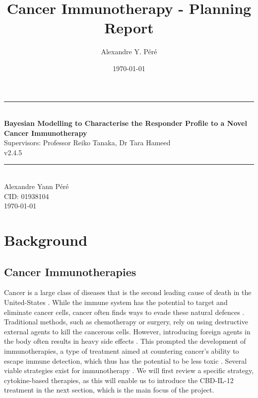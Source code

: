 \documentclass[11pt]{article}
\title{Cancer Immunotherapy - Planning Report}
\author{Alexandre Y. Péré }
\date{\today}
\begin{document}
\begin{titlepage}
    \newcommand{\HRule}{\rule{\linewidth}{0.5mm}}
    \begin{center}
        \HRule \\[0.4cm]
    { \LARGE \bfseries Bayesian Modelling to Characterise the Responder Profile to a  Novel Cancer Immunotherapy\\[0.55cm] }
    { \large Supervisors: Professor Reiko Tanaka, Dr Tara Hameed} \\
    v2.4.5
    \\[0.4cm]
    \HRule \\[0.5cm]
    { \large Alexandre Yann Péré \\[0.1cm]
    CID: 01938104  \\[0.1cm]
    \today \\ [0.1cm]
    \vspace{10pt}}
    \end{center}
\end{titlepage}

\tableofcontents

\pagebreak 
\section{Background}\label{sec:specs}

\subsection{Cancer Immunotherapies}\label{sec:cancer}
Cancer is a large class of diseases that is the second leading cause of death in the United-States \cite{nchs}. While the immune system has the potential to target and eliminate cancer cells, cancer often finds ways to evade these natural defences \cite{EvasionMech}. Traditional methods, such as chemotherapy or surgery, rely on using destructive external agents to kill the cancerous cells. However, introducing foreign agents in the body often results in heavy side effects \cite{oncologyTreatRev}. This prompted the development of immunotherapies, a type of treatment aimed at countering cancer's ability to escape immune detection, which thus has the potential to be less toxic \cite{toxicImmuno}. Several viable strategies exist for immunotherapy \cite{ReviewCPI}. We will first review a specific strategy, cytokine-based therapies, as this will enable us to introduce the CBD-IL-12 treatment in the next section, which is the main focus of the project.
\end{document}
